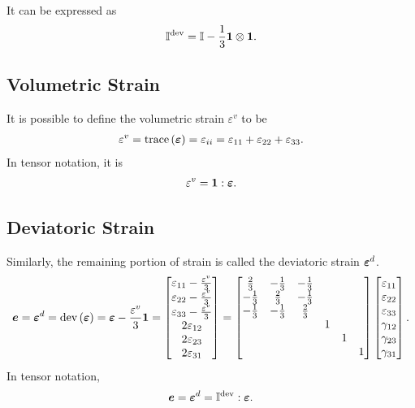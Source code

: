 It can be expressed as
\begin{gather}
\mathbb{I}^\text{dev}=\mathbb{I}-\dfrac{1}{3}\bm{1}\otimes\bm{1}.
\end{gather}
\subsection{Volumetric Strain}
It is possible to define the volumetric strain $\varepsilon^v$ to be
\begin{gather}
\varepsilon^v=\text{trace}\left(\bm{\varepsilon}\right)=\varepsilon_{ii}=\varepsilon_{11}+\varepsilon_{22}+\varepsilon_{33}.
\end{gather}
In tensor notation, it is
\begin{gather}
\varepsilon^v=\bm{1}:\bm{\varepsilon}.
\end{gather}
\subsection{Deviatoric Strain}
Similarly, the remaining portion of strain is called the deviatoric strain $\bm{\varepsilon}^d$.
\begin{gather}
\bm{e}=\bm{\varepsilon}^d=\text{dev}\left(\bm{\varepsilon}\right)=\bm{\varepsilon}-\dfrac{\varepsilon^v}{3}\bm{1}=\begin{bmatrix}
\varepsilon_{11}-\frac{\varepsilon^v}{3}\\\varepsilon_{22}-\frac{\varepsilon^v}{3}\\\varepsilon_{33}-\frac{\varepsilon^v}{3}\\2\varepsilon_{12}\\2\varepsilon_{23}\\2\varepsilon_{31}
\end{bmatrix}=\begin{bmatrix}
\frac{2}{3}&-\frac{1}{3}&-\frac{1}{3}&&&\\
-\frac{1}{3}&\frac{2}{3}&-\frac{1}{3}&&&\\
-\frac{1}{3}&-\frac{1}{3}&\frac{2}{3}&&&\\
&&&1&&\\
&&&&1&\\
&&&&&1
\end{bmatrix}\begin{bmatrix}
\varepsilon_{11}\\\varepsilon_{22}\\\varepsilon_{33}\\\gamma_{12}\\\gamma_{23}\\\gamma_{31}
\end{bmatrix}.
\end{gather}
In tensor notation,
\begin{gather}
\bm{e}=\bm{\varepsilon}^d=\mathbb{I}^\text{dev}:\bm{\varepsilon}.
\end{gather}
